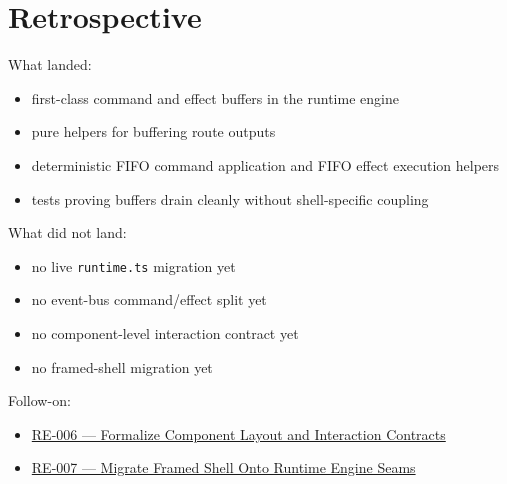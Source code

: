 \section{Retrospective}\label{record-153-retrospective}

What landed:

\begin{itemize}
\tightlist
\item
  first-class command and effect buffers in the runtime engine
\item
  pure helpers for buffering route outputs
\item
  deterministic FIFO command application and FIFO effect execution helpers
\item
  tests proving buffers drain cleanly without shell-specific coupling
\end{itemize}

What did not land:

\begin{itemize}
\tightlist
\item
  no live \texttt{r\allowbreak{}u\allowbreak{}n\allowbreak{}t\allowbreak{}i\allowbreak{}m\allowbreak{}e\allowbreak{}.\allowbreak{}t\allowbreak{}s} migration yet
\item
  no event-bus command/effect split yet
\item
  no component-level interaction contract yet
\item
  no framed-shell migration yet
\end{itemize}

Follow-on:

\begin{itemize}
\tightlist
\item
  \href{https://github.com/flyingrobots/bijou/blob/cbd70612140e7a450d764b3c7be1c6af878b99bc/docs/design/RE-006-formalize-component-layout-and-interaction-contracts.md}{RE-006 --- Formalize Component Layout and Interaction Contracts}
\item
  \href{https://github.com/flyingrobots/bijou/blob/cbd70612140e7a450d764b3c7be1c6af878b99bc/docs/method/graveyard/legacy-backlog/up-next/RE-007-migrate-framed-shell-onto-runtime-engine-seams.md}{RE-007 --- Migrate Framed Shell Onto Runtime Engine Seams}
\end{itemize}

